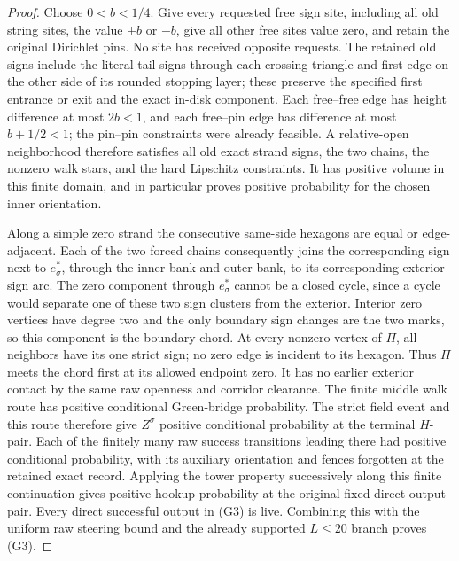 \begin{proof}
Choose \(0<b<1/4\).  Give every requested free sign site, including all
old string sites, the value \(+b\) or \(-b\), give all other free sites
value zero, and retain the original Dirichlet pins.  No site has received
opposite requests.  The retained old signs include the literal tail
signs through each crossing triangle and first edge on the other side of
its rounded stopping layer; these preserve the specified first entrance
or exit and the exact in-disk component.  Each free--free edge has height difference at most
\(2b<1\), and each free--pin edge has difference at most
\(b+1/2<1\); the pin--pin constraints were already feasible.  A
relative-open neighborhood therefore satisfies all old exact strand
signs, the two chains, the nonzero walk stars, and the hard Lipschitz
constraints.  It has positive volume in this finite domain, and in
particular proves positive probability for the chosen inner orientation.

Along a simple zero strand the consecutive same-side hexagons are equal
or edge-adjacent.  Each of the two forced chains consequently joins the
corresponding sign next to \(e_\sigma^*\), through the inner bank and
outer bank, to its corresponding exterior sign arc.  The zero component
through \(e_\sigma^*\) cannot be a closed cycle, since a cycle would
separate one of these two sign clusters from the exterior.  Interior zero
vertices have degree two and the only boundary sign changes are the two
marks, so this component is the boundary chord.  At every nonzero
vertex of \(\Pi\), all neighbors have its one strict sign; no zero edge
is incident to its hexagon.  Thus \(\Pi\) meets the chord first at its
allowed endpoint zero.  It has no earlier exterior contact by the same
raw openness and corridor clearance.  The finite middle walk route has
positive conditional Green-bridge probability.  The strict field event
and this route therefore give \(Z^\sigma\) positive conditional
probability at the terminal \(H\)-pair.  Each of the finitely many raw
success transitions leading there had positive conditional probability,
with its auxiliary orientation and fences forgotten at the retained exact
record.  Applying the tower property successively along this finite
continuation gives positive hookup probability at the original fixed
direct output pair.  Every direct successful output in (G3) is live.
Combining this with the uniform raw steering bound
and the already supported \(L\le20\) branch proves (G3).


\end{proof}
